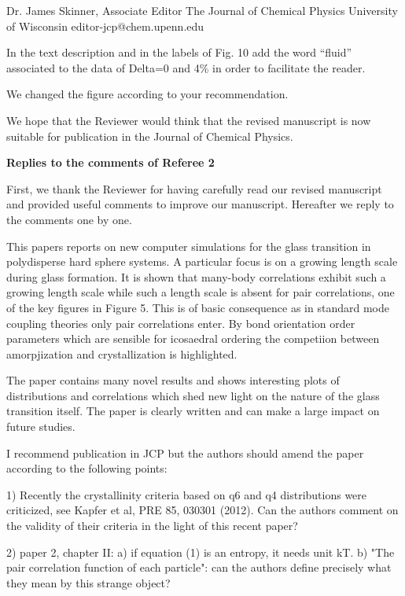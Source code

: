 \documentclass[a4paper, rebuttal, parskip=true, firsthead=false, fromemail=true, foldmarks=false]{scrlttr2}
\begin{document}
\begin{letter}{Dr. James Skinner, Associate Editor
The Journal of Chemical Physics
University of Wisconsin
editor-jcp@chem.upenn.edu }
\begin{quotationi}
In the text description and in the labels of Fig. 10 add the word ``fluid'' associated to the data of Delta=0 and 4\% in order to facilitate the reader.
\end{quotationi}
We changed the figure according to your recommendation.

We hope that the Reviewer would think that the revised manuscript is now suitable for publication in the Journal of Chemical Physics. 


\textsf{\textbf{Replies to the comments of Referee 2}}

First, we thank the Reviewer for having carefully read our revised manuscript and provided useful comments to improve our manuscript. 
Hereafter we reply to the comments one by one.

\begin{quotationi}
This papers reports on new computer simulations for the glass transition
in polydisperse hard sphere systems. A particular focus is on a growing
length scale during glass formation. It is shown that many-body
correlations exhibit such a growing length scale while such a length scale
is absent for pair
correlations, one of the key figures in Figure 5.
This is of basic consequence as in standard mode
coupling theories only pair correlations enter.
By bond orientation
order parameters which are sensible for icosaedral ordering the competiion
between amorpjization and crystallization is highlighted.

The paper contains many novel results and shows interesting plots of
distributions and correlations which shed new light on the nature of
the glass transition itself. The paper is clearly written
and can make a large impact on future studies.

I recommend publication in JCP but the authors should amend the paper
according to the following points:

1) Recently the crystallinity criteria based on q6 and q4 distributions
were criticized, see Kapfer et al, PRE 85, 030301 (2012). Can the authors
comment on the validity of their criteria in the light of this recent paper?
\end{quotationi}

\begin{quotationi}
2) paper 2, chapter II: a) if equation (1) is an entropy, it needs unit kT.
b) "The pair correlation function of each particle": can the authors
define precisely what they mean by this strange object?
\end{quotationi}


\end{letter}
\end{document}
